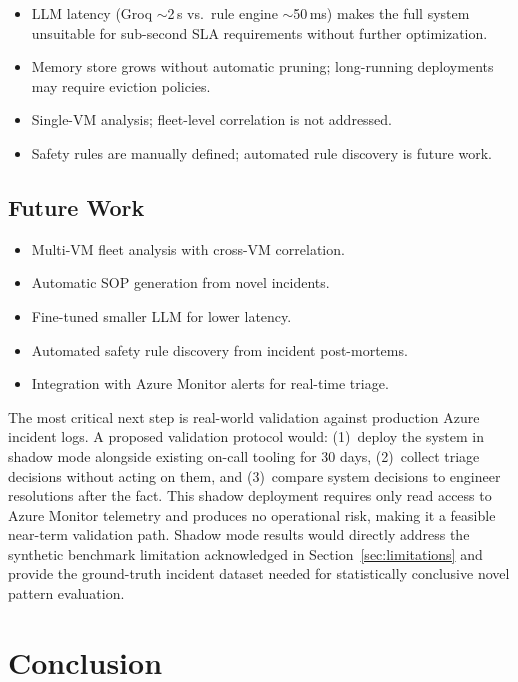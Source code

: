 \documentclass[a4paper,10pt,journal,compsoc]{IEEEtran}
\begin{document}
\begin{itemize}
\item LLM latency (Groq $\sim$2\,s vs.\ rule engine $\sim$50\,ms)
  makes the full system unsuitable for sub-second SLA requirements
  without further optimization.

\item Memory store grows without automatic pruning; long-running
  deployments may require eviction policies.

\item Single-VM analysis; fleet-level correlation is not addressed.

\item Safety rules are manually defined; automated rule discovery is
  future work.
\end{itemize}

\subsection{Future Work}

\begin{itemize}
\item Multi-VM fleet analysis with cross-VM correlation.
\item Automatic SOP generation from novel incidents.
\item Fine-tuned smaller LLM for lower latency.
\item Automated safety rule discovery from incident post-mortems.
\item Integration with Azure Monitor alerts for real-time triage.
\end{itemize}

The most critical next step is real-world validation against production
Azure incident logs. A proposed validation protocol would: (1)~deploy
the system in shadow mode alongside existing on-call tooling for 30
days, (2)~collect triage decisions without acting on them, and
(3)~compare system decisions to engineer resolutions after the fact.
This shadow deployment requires only read access to Azure Monitor
telemetry and produces no operational risk, making it a feasible
near-term validation path. Shadow mode results would directly address
the synthetic benchmark limitation acknowledged in
Section~\ref{sec:limitations} and provide the ground-truth incident
dataset needed for statistically conclusive novel pattern evaluation.

\section{Conclusion}
\label{sec:conclusion}
\end{document}
